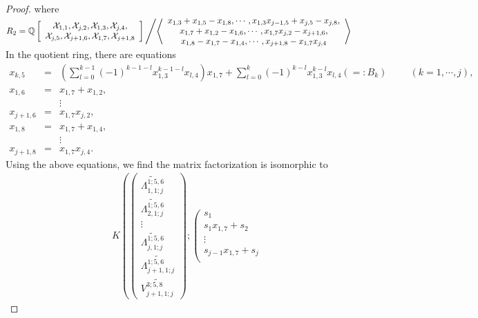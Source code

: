 \documentclass[10pt]{amsart}
\theoremstyle{break}
\begin{document}
\begin{proof}
where 
$
R_2={{\mathbb{Q}}}\left[
\begin{array}{c}
\mathcal{X}_{1,1},\mathcal{X}_{j,2},\mathcal{X}_{1,3},\mathcal{X}_{j,4},\\
\mathcal{X}_{j,5},\mathcal{X}_{j+1,6},\mathcal{X}_{1,7},\mathcal{X}_{j+1,8}
\end{array}
\right]
\left/\left<
\begin{array}{c}
x_{1,3}+x_{1,5}-x_{1,8},
\cdots,
x_{1,3}x_{j-1,5}+x_{j,5}-x_{j,8},\\
x_{1,7}+x_{1,2}-x_{1,6},
\cdots,
x_{1,7}x_{j,2}-x_{j+1,6},\\
x_{1,8}-x_{1,7}-x_{1,4},
\cdots,
x_{j+1,8}-x_{1,7}x_{j,4}
\end{array}
\right>\right.
$\\

In the quotient ring, there are equations
\begin{eqnarray*}
x_{k,5}&=&\left(\sum_{l=0}^{k-1}(-1)^{k-1-l}x_{1,3}^{k-1-l}x_{l,4}\right)x_{1,7}+\sum_{l=0}^{k}(-1)^{k-l}x_{1,3}^{k-l}x_{l,4}(=:B_k)\hspace{1cm}(k=1,\cdots,j),\\[-0.1em]
x_{1,6}&=&x_{1,7}+x_{1,2},\\[-0.1em]
&&\vdots\\[-0.1em]
x_{j+1,6}&=&x_{1,7}x_{j,2},\\[-0.1em]
x_{1,8}&=&x_{1,7}+x_{1,4},\\[-0.1em]
&&\vdots\\[-0.1em]
x_{j+1,8}&=&x_{1,7}x_{j,4}.
\end{eqnarray*}
Using the above equations, we find the matrix factorization is isomorphic to
\begin{eqnarray*}
&&
K\left(\left(
\begin{array}{c}
\widetilde{\Lambda_{1,1;j}^{1;5,6}}\\[.5em]
\widetilde{\Lambda_{2,1;j}^{1;5,6}}\\[.5em]
\vdots\\[.5em]
\widetilde{\Lambda_{j,1;j}^{1;5,6}}\\[.5em]
\widetilde{\Lambda_{j+1,1;j}^{1;5,6}}\\[.5em]
\widetilde{V_{j+1,1;j}^{3;5,8}}
\end{array}
\right)
;
\left(
\begin{array}{c}
s_1\\[1em]
s_1 x_{1,7}+s_2\\[1em]
\vdots\\[1em]
s_{j-1} x_{1,7}+s_j\\[1em]

\end{array}
\end{eqnarray*}
\end{proof}
\end{document}
